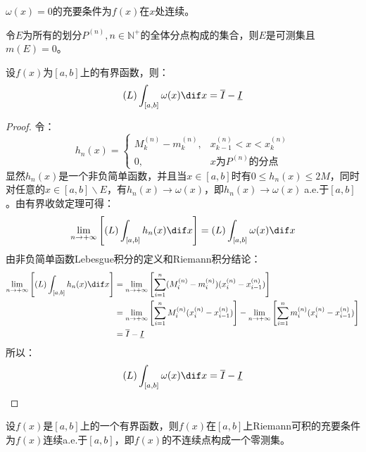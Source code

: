 \begin{theorem}
	$\omega(x)=0$的充要条件为$f(x)$在$x$处连续。
\end{theorem}
\begin{theorem}
	令$E$为所有的划分$P^{(n)},n\in\mathbb{N}^+$的全体分点构成的集合，则$E$是可测集且$m(E)=0$。
\end{theorem}
\begin{theorem}
	设$f(x)$为$[a,b]$上的有界函数，则：
	\begin{equation*}
		(L)\int_{[a,b]}^{}\omega(x)\dif x=\overline{I}-\underline{I}
	\end{equation*}
\end{theorem}
\begin{proof}
	令：
	\begin{equation*}
		h_n(x)=
		\begin{cases}
			M_k^{(n)}-m_k^{(n)},&x_{k-1}^{(n)}<x<x_{k}^{(n)} \\
			0, &x\text{为$P^{(n)}$的分点}
		\end{cases}
	\end{equation*}
	显然$h_n(x)$是一个非负简单函数，并且当$x\in[a,b]$时有$0\leqslant h_n(x)\leqslant 2M$，同时对任意的$x\in[a,b]\backslash E$，有$h_n(x)\to\omega(x)$，即$h_n(x)\to\omega(x)\;$a.e.于$[a,b]$。由有界收敛定理可得：
	\begin{equation*}
		\lim_{n\to+\infty}\left[(L)\int_{[a,b]}^{}h_n(x)\dif x\right]=(L)\int_{[a,b]}^{}\omega(x)\dif x
	\end{equation*}
	由非负简单函数Lebesgue积分的定义和Riemann积分结论：
	\begin{align*}
		\lim_{n\to+\infty}\left[(L)\int_{[a,b]}^{}h_n(x)\dif x\right]
		&=\lim_{n\to+\infty}\left[\sum_{i=1}^{n}(M_i^{(n)}-m_i^{(n)})(x_i^{(n)}-x_{i-1}^{(n)})\right] \\
		&=\lim_{n\to+\infty}\left[\sum_{i=1}^{n}M_i^{(n)}(x_i^{(n)}-x_{i-1}^{(n)})\right]-\lim_{n\to+\infty}\left[\sum_{i=1}^{n}m_i^{(n)}(x_i^{(n)}-x_{i-1}^{(n)})\right] \\
		&=\overline{I}-\underline{I}
	\end{align*}
	所以：
	\begin{equation*}
		(L)\int_{[a,b]}^{}\omega(x)\dif x=\overline{I}-\underline{I}\qedhere
	\end{equation*}
\end{proof}
\begin{theorem}
	设$f(x)$是$[a,b]$上的一个有界函数，则$f(x)$在$[a,b]$上Riemann可积的充要条件为$f(x)$连续a.e.于$[a,b]$，即$f(x)$的不连续点构成一个零测集。
\end{theorem}
